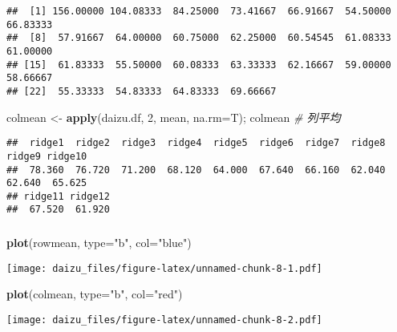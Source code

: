 \documentclass[]{article}
\newenvironment{Shaded}{\begin{snugshade}}{\end{snugshade}}
\newcommand{\CommentTok}[1]{\textcolor[rgb]{0.56,0.35,0.01}{\textit{#1}}}
\newcommand{\DataTypeTok}[1]{\textcolor[rgb]{0.13,0.29,0.53}{#1}}
\newcommand{\DecValTok}[1]{\textcolor[rgb]{0.00,0.00,0.81}{#1}}
\newcommand{\KeywordTok}[1]{\textcolor[rgb]{0.13,0.29,0.53}{\textbf{#1}}}
\newcommand{\NormalTok}[1]{#1}
\newcommand{\StringTok}[1]{\textcolor[rgb]{0.31,0.60,0.02}{#1}}
\begin{document}
\begin{verbatim}
##  [1] 156.00000 104.08333  84.25000  73.41667  66.91667  54.50000  66.83333
##  [8]  57.91667  64.00000  60.75000  62.25000  60.54545  61.08333  61.00000
## [15]  61.83333  55.50000  60.08333  63.33333  62.16667  59.00000  58.66667
## [22]  55.33333  54.83333  64.83333  69.66667
\end{verbatim}

\begin{Shaded}
\begin{Highlighting}[]
\NormalTok{    colmean <-}\StringTok{ }\KeywordTok{apply}\NormalTok{(daizu.df, }\DecValTok{2}\NormalTok{, mean, }\DataTypeTok{na.rm=}\NormalTok{T); colmean       }\CommentTok{# 列平均}
\end{Highlighting}
\end{Shaded}

\begin{verbatim}
##  ridge1  ridge2  ridge3  ridge4  ridge5  ridge6  ridge7  ridge8  ridge9 ridge10 
##  78.360  76.720  71.200  68.120  64.000  67.640  66.160  62.040  62.640  65.625 
## ridge11 ridge12 
##  67.520  61.920
\end{verbatim}

\hypertarget{section}{%
\subsubsection{}\label{section}}

\begin{Shaded}
\begin{Highlighting}[]
    \KeywordTok{plot}\NormalTok{(rowmean, }\DataTypeTok{type=}\StringTok{"b"}\NormalTok{, }\DataTypeTok{col=}\StringTok{"blue"}\NormalTok{) }
\end{Highlighting}
\end{Shaded}

\texttt{[image: daizu\_files/figure-latex/unnamed-chunk-8-1.pdf]}

\begin{Shaded}
\begin{Highlighting}[]
    \KeywordTok{plot}\NormalTok{(colmean, }\DataTypeTok{type=}\StringTok{"b"}\NormalTok{, }\DataTypeTok{col=}\StringTok{"red"}\NormalTok{)}
\end{Highlighting}
\end{Shaded}

\texttt{[image: daizu\_files/figure-latex/unnamed-chunk-8-2.pdf]}
\end{document}
